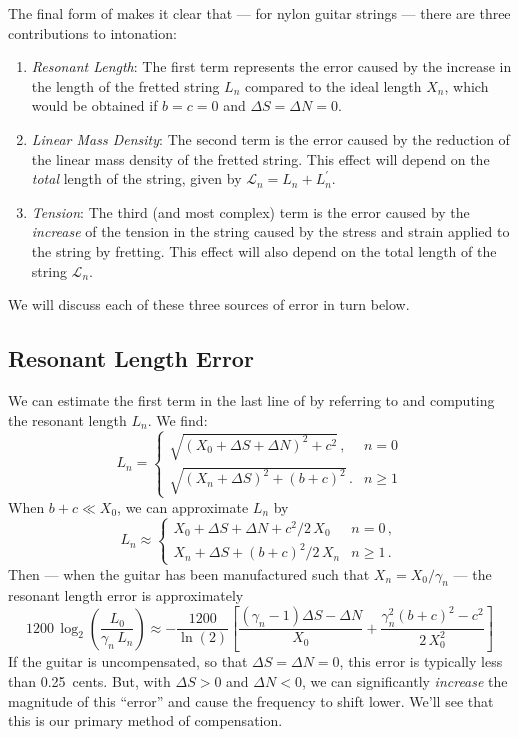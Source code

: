 The final form of  makes it clear that --- for nylon guitar strings --- there are three contributions to intonation:
 \begin{enumerate}
  \item
   \emph{Resonant Length}: The first term represents the error caused by the increase in the length of the fretted string $L_n$ compared to the ideal length $X_n$, which would be obtained if $b = c = 0$ and $\Delta S = \Delta N = 0$.
  \item
   \emph{Linear Mass Density}: The second term is the error caused by the reduction of the linear mass density of the fretted string. This effect will depend on the \emph{total} length of the string, given by $\mathcal{L}_n = L_n + L^\prime_n$.
  \item
   \emph{Tension}: The third (and most complex) term is the error caused by the \emph{increase} of the tension in the string caused by the stress and strain applied to the string by fretting. This effect will also depend on the total length of the string $\mathcal{L}_n$.
 \end{enumerate}
We will discuss each of these three sources of error in turn below.

 \subsection{Resonant Length Error}
We can estimate the first term in the last line of  by referring to  and computing the resonant length $L_n$. We find:
 \begin{equation}  \label{eqn:l_n_def}
L_n = \begin{cases}
\sqrt{\left(X_0 + \Delta S + \Delta N\right)^2 + c^2}\, , & n =  0 \\
\sqrt{\left(X_n + \Delta S\right)^2 + (b + c)^2}\, . & n \ge 1
 \end{cases}
 \end{equation}
When $b + c \ll X_0$, we can approximate $L_n$ by
 \begin{equation} \label{eqn:l_n_approx}
L_n \approx \begin{cases}
X_0 + \Delta S + \Delta N + c^2/2\, X_0 & n =  0\, , \\
X_n + \Delta S + (b + c)^2/2\, X_n & n \ge 1\, .
 \end{cases}
 \end{equation}
Then --- when the guitar has been manufactured such that $X_n = X_0 / \gamma_n$ --- the resonant length error is approximately
  \begin{equation} \label{eqn:rle_approx}
  1200\, \log_2 \left( \frac{L_0}{\gamma_n\, L_n} \right) \approx -\frac{1200}{\ln(2)} \left[ \frac{\left(\gamma_n - 1\right) \Delta S - \Delta N}{X_0} + \frac{\gamma_n^2 (b + c)^2 - c^2}{2\, X_0^2}\right]
  \end{equation}
If the guitar is uncompensated, so that $\Delta S = \Delta N = 0$, this error is typically less than 0.25~cents. But, with $\Delta S > 0$ and $\Delta N < 0$, we can significantly \emph{increase} the magnitude of this ``error'' and cause the frequency to shift lower. We'll see that this is our primary method of compensation. 

